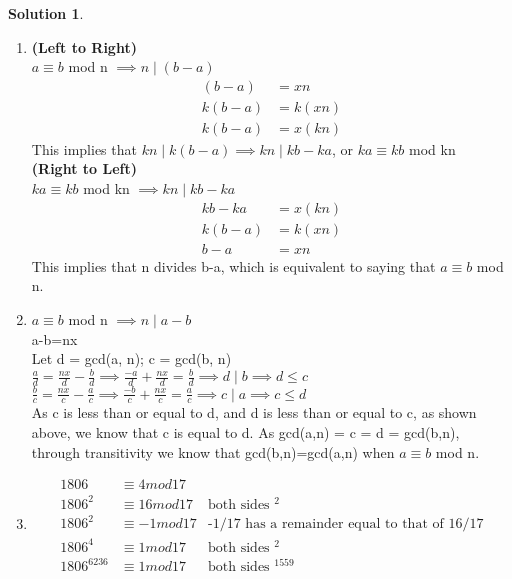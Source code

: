 \documentclass{article}
\theoremstyle{definition}
\newtheorem*{solution}{Solution}
\begin{document}
\begin{solution}
\begin{enumerate}[label=\alph*)]
    \item \textbf{(Left to Right)}\\
    $a\equiv b$ mod n $\implies n \mid (b-a)$
    \begin{align*}
        (b-a)&=xn\\
        k(b-a)&=k(xn)\\
        k(b-a)&=x(kn)
    \end{align*}
    This implies that $kn \mid k(b-a) \implies kn \mid kb-ka$, or $ka\equiv kb$ mod kn\\
    \textbf{(Right to Left)}\\
    $ka\equiv kb$ mod kn $\implies kn \mid kb-ka$
    \begin{align*}
        kb-ka&=x(kn)\\
        k(b-a)&=k(xn)\\
        b-a&=xn
    \end{align*}
    This implies that n divides b-a, which is equivalent to saying that $a\equiv b$ mod n.
    
    \item
    $a\equiv b$ mod n $\implies n \mid a-b$\\
    a-b=nx\\
    Let d = gcd(a, n); c = gcd(b, n)\\
    $\frac{a}{d}=\frac{nx}{d} - \frac{b}{d} \implies \frac{-a}{d} + \frac{nx}{d} = \frac{b}{d} \implies d \mid b \implies d\leq c$\\
    $\frac{b}{c}=\frac{nx}{c} - \frac{a}{c} \implies \frac{-b}{c} + \frac{nx}{c} = \frac{a}{c} \implies c \mid a \implies c\leq d$\\
    As c is less than or equal to d, and d is less than or equal to c, as shown above, we know that c is equal to d. As gcd(a,n) = c = d = gcd(b,n), through transitivity we know that gcd(b,n)=gcd(a,n) when $a\equiv b$ mod n.
    
    \item
    \begin{align*}
        1806 &\equiv 4 mod 17\\
        1806^2 &\equiv 16 mod 17 &\text{both sides $^2$}\\
        1806^2 &\equiv -1 mod 17 &\text{-1/17 has a remainder equal to that of 16/17}\\
        1806^4&\equiv 1 mod 17 &\text{both sides $^2$}\\
        1806^{6236} &\equiv 1 mod 17 &\text{both sides $^{1559}$}
    \end{align*}
\end{enumerate}
\end{solution}
\end{document}
